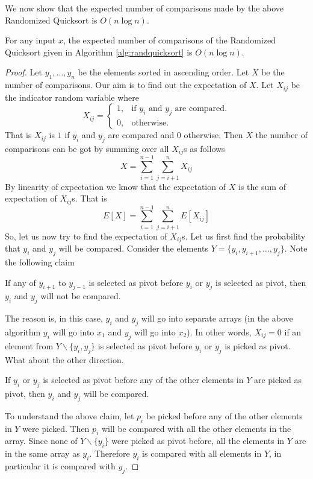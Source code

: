  \noindent We now show that the expected number of comparisons made by the above Randomized Quicksort is $O(n \log n)$.
 \begin{lemma}
 For any input $x$, the expected number of comparisons of the Randomized Quicksort given in Algorithm \ref{alg:randquicksort} is $O(n \log n)$.
 \end{lemma}
 \begin{proof}
 Let $y_1,\dots,y_n$ be the elements sorted in ascending order. Let $X$ be the number of comparisons. Our aim is to find out the expectation of $X$. Let $X_{ij}$ be the indicator random variable where
\begin{equation}
  X_{ij}=\begin{cases}
    1, & \text{if $y_i$ and $y_j$ are compared}.\\
    0, & \text{otherwise}.
  \end{cases}
\end{equation}
That is $X_{ij}$ is $1$ if $y_i$ and $y_j$ are compared and $0$ otherwise. Then $X$ the number of comparisons can be got by summing over all $X_{ij}$s as follows
\[
X = \sum_{i=1}^{n-1} \sum_{j=i+1}^n X_{ij}
\]
By linearity of expectation we know that the expectation of $X$ is the sum of expectation of $X_{ij}$s. That is
\[
E[X] = \sum_{i=1}^{n-1} \sum_{j=i+1}^n E[X_{ij}]
\]
So, let us now try to find the expectation of $X_{ij}$s. Let us first find the probability that $y_i$ and $y_j$ will be compared. Consider the elements $Y=\{y_i,y_{i+1},\dots,y_j\}$. Note the following claim
\begin{claim}
If any of $y_{i+1}$ to $y_{j-1}$ is selected as pivot before $y_i$ or $y_j$ is selected as pivot, then $y_i$ and $y_j$ will not be compared. \end{claim}
\noindent The reason is, in this case, $y_i$ and $y_j$ will go into separate arrays (in the above algorithm $y_i$ will go into $x_1$ and $y_j$ will go into $x_2$). In other words, $X_{ij}=0$ if an element from $Y \backslash \{y_i,y_j\}$ is selected as pivot before $y_i$ or $y_j$ is picked as pivot. What about the other direction. 
\begin{claim}
If $y_i$ or $y_j$ is selected as pivot before any of the other elements in $Y$ are picked as pivot, then $y_i$ and $y_j$ will be compared.
\end{claim}
\noindent To understand the above claim, let $p_i$ be picked before any of the other elements in $Y$ were picked. Then $p_i$ will be compared with all the other elements in the array. Since none of $Y \backslash \{y_i\}$ were picked as pivot before, all the elements in $Y$ are in the same array as $y_i$. Therefore $y_i$ is compared with all elements in $Y$, in particular it is compared with $y_j$. 


\end{proof}
